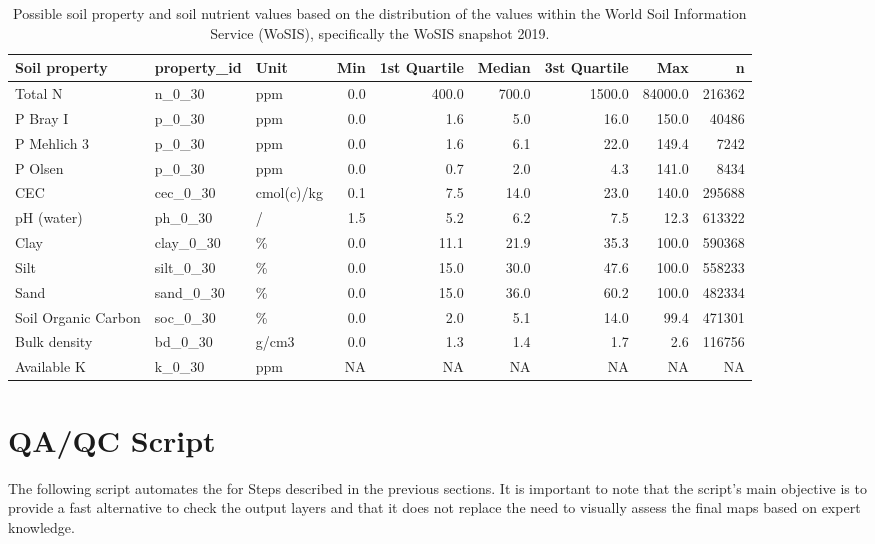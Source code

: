 \documentclass[
  10pt,
  b5paper,
  oneside]{book}
\begin{document}
\begin{table}

\caption{\label{tab:ranges}\label{tab:ranges}Possible soil property and soil nutrient values based on the distribution of the values within the World Soil Information Service (WoSIS), specifically the WoSIS snapshot 2019.}
\centering
\begin{tabular}[t]{lllrrrrrr}
\toprule
Soil property & property\_id & Unit & Min & 1st Quartile & Median & 3st Quartile & Max & n\\
\midrule
Total N & n\_0\_30 & ppm & 0.0 & 400.0 & 700.0 & 1500.0 & 84000.0 & 216362\\
P Bray I & p\_0\_30 & ppm & 0.0 & 1.6 & 5.0 & 16.0 & 150.0 & 40486\\
P Mehlich 3 & p\_0\_30 & ppm & 0.0 & 1.6 & 6.1 & 22.0 & 149.4 & 7242\\
P Olsen & p\_0\_30 & ppm & 0.0 & 0.7 & 2.0 & 4.3 & 141.0 & 8434\\
CEC & cec\_0\_30 & cmol(c)/kg & 0.1 & 7.5 & 14.0 & 23.0 & 140.0 & 295688\\
\addlinespace
pH (water) & ph\_0\_30 & / & 1.5 & 5.2 & 6.2 & 7.5 & 12.3 & 613322\\
Clay & clay\_0\_30 & \% & 0.0 & 11.1 & 21.9 & 35.3 & 100.0 & 590368\\
Silt & silt\_0\_30 & \% & 0.0 & 15.0 & 30.0 & 47.6 & 100.0 & 558233\\
Sand & sand\_0\_30 & \% & 0.0 & 15.0 & 36.0 & 60.2 & 100.0 & 482334\\
Soil Organic Carbon & soc\_0\_30 & \% & 0.0 & 2.0 & 5.1 & 14.0 & 99.4 & 471301\\
\addlinespace
Bulk density & bd\_0\_30 & g/cm3 & 0.0 & 1.3 & 1.4 & 1.7 & 2.6 & 116756\\
Available K & k\_0\_30 & ppm & NA & NA & NA & NA & NA & NA\\
\bottomrule
\end{tabular}
\end{table}

\hypertarget{qaqc-script}{%
\section*{QA/QC Script}\label{qaqc-script}}

The following script automates the for Steps described in the previous sections. It is important to note that the script's main objective is to provide a fast alternative to check the output layers and that it does not replace the need to visually assess the final maps based on expert knowledge.
\end{document}
